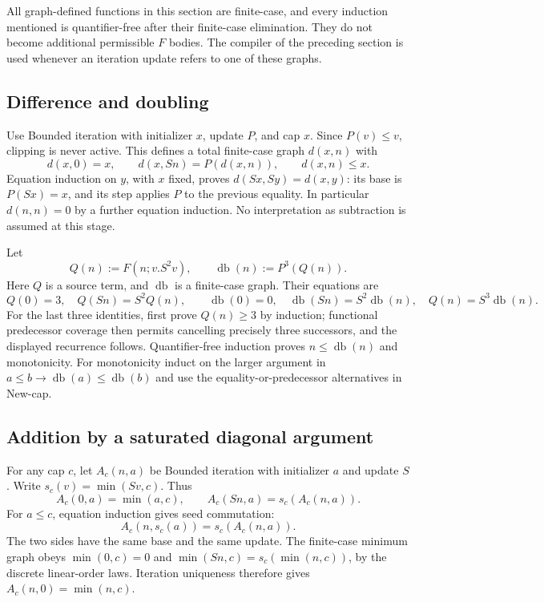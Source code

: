All graph-defined functions in this section are finite-case, and every
induction mentioned is quantifier-free after their finite-case
elimination. They do not become additional permissible $F$ bodies.
The compiler of the preceding section is used whenever an iteration
update refers to one of these graphs.

\subsection{Difference and doubling}
Use Bounded iteration with initializer $x$, update $P$, and cap $x$.
Since $P(v)\le v$, clipping is never active. This defines a total
finite-case graph $d(x,n)$ with
\[
d(x,0)=x,\qquad d(x,Sn)=P(d(x,n)),\qquad d(x,n)\le x.
\]
Equation induction on $y$, with $x$ fixed, proves
$d(Sx,Sy)=d(x,y)$: its base is $P(Sx)=x$, and its step applies $P$
to the previous equality. In particular $d(n,n)=0$ by a further
equation induction. No interpretation as subtraction is assumed
at this stage.

Let
\[
 Q(n):=F(n;v.S^2v),\qquad \operatorname{db}(n):=P^3(Q(n)).
\]
Here $Q$ is a source term, and $\operatorname{db}$ is a finite-case
graph. Their equations are
\[
 Q(0)=3,\quad Q(Sn)=S^2Q(n),\qquad
 \operatorname{db}(0)=0,\quad
 \operatorname{db}(Sn)=S^2\operatorname{db}(n),\quad
 Q(n)=S^3\operatorname{db}(n).
\]
For the last three identities, first prove $Q(n)\ge3$ by induction;
functional predecessor coverage then permits cancelling precisely
three successors, and the displayed recurrence follows. Quantifier-free
induction proves $n\le\operatorname{db}(n)$ and monotonicity. For
monotonicity induct on the larger argument in
$a\le b\to\operatorname{db}(a)\le\operatorname{db}(b)$ and use
the equality-or-predecessor alternatives in New-cap.

\subsection{Addition by a saturated diagonal argument}
For any cap $c$, let $A_c(n,a)$ be Bounded iteration with initializer
$a$ and update $S$. Write $s_c(v)=\min(Sv,c)$. Thus
\[
 A_c(0,a)=\min(a,c),\qquad A_c(Sn,a)=s_c(A_c(n,a)).
\]
For $a\le c$, equation induction gives seed commutation:
\[
                  A_c(n,s_c(a))=s_c(A_c(n,a)).
 \tag{Seed commute}
\]
The two sides have the same base and the same update. The finite-case
minimum graph obeys $\min(0,c)=0$ and
$\min(Sn,c)=s_c(\min(n,c))$, by the discrete linear-order laws.
Iteration uniqueness therefore gives
$A_c(n,0)=\min(n,c)$.

